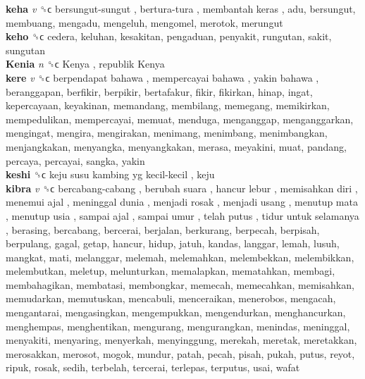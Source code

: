 \textbf{keha} \emph{v}  ␝ϲ   bersungut-sungut ,  bertura-tura ,  membantah keras , adu, bersungut, membuang, mengadu, mengeluh, mengomel, merotok, merungut  \\
\textbf{keho} ␝ϲ  cedera, keluhan, kesakitan, pengaduan, penyakit, rungutan, sakit, sungutan  \\
\textbf{Kenia} \emph{n}  ␝ϲ   Kenya ,  republik Kenya   \\
\textbf{kere} \emph{v}  ␝ϲ   berpendapat bahawa ,  mempercayai bahawa ,  yakin bahawa , beranggapan, berfikir, berpikir, bertafakur, fikir, fikirkan, hinap, ingat, kepercayaan, keyakinan, memandang, membilang, memegang, memikirkan, mempedulikan, mempercayai, memuat, menduga, menganggap, menganggarkan, mengingat, mengira, mengirakan, menimang, menimbang, menimbangkan, menjangkakan, menyangka, menyangkakan, merasa, meyakini, muat, pandang, percaya, percayai, sangka, yakin  \\
\textbf{keshi} ␝ϲ   keju susu kambing yg kecil-kecil , keju  \\
\textbf{kibra} \emph{v}  ␝ϲ   bercabang-cabang ,  berubah suara ,  hancur lebur ,  memisahkan diri ,  menemui ajal ,  meninggal dunia ,  menjadi rosak ,  menjadi usang ,  menutup mata ,  menutup usia ,  sampai ajal ,  sampai umur ,  telah putus ,  tidur untuk selamanya , berasing, bercabang, bercerai, berjalan, berkurang, berpecah, berpisah, berpulang, gagal, getap, hancur, hidup, jatuh, kandas, langgar, lemah, lusuh, mangkat, mati, melanggar, melemah, melemahkan, melembekkan, melembikkan, melembutkan, meletup, melunturkan, memalapkan, mematahkan, membagi, membahagikan, membatasi, membongkar, memecah, memecahkan, memisahkan, memudarkan, memutuskan, mencabuli, menceraikan, menerobos, mengacah, mengantarai, mengasingkan, mengempukkan, mengendurkan, menghancurkan, menghempas, menghentikan, mengurang, mengurangkan, menindas, meninggal, menyakiti, menyaring, menyerkah, menyinggung, merekah, meretak, meretakkan, merosakkan, merosot, mogok, mundur, patah, pecah, pisah, pukah, putus, reyot, ripuk, rosak, sedih, terbelah, tercerai, terlepas, terputus, usai, wafat  \\
